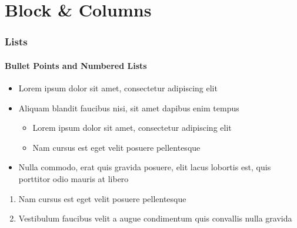 \documentclass[
	10pt, %
]{beamer}
\begin{document}
\begin{frame}
\begin{columns}[t]
\begin{column}{0.5\textwidth}
\begin{center}
\end{center}
		\end{column}
	\end{columns}
\end{frame}


\section{Block \& Columns}
\begin{frame}
	\frametitle{Lists}
	\framesubtitle{Bullet Points and Numbered Lists} %

	\begin{itemize}
		\item Lorem ipsum dolor sit amet, consectetur adipiscing elit
		\item Aliquam blandit faucibus nisi, sit amet dapibus enim tempus
		\begin{itemize}
			\item Lorem ipsum dolor sit amet, consectetur adipiscing elit
			\item Nam cursus est eget velit posuere pellentesque
		\end{itemize}
		\item Nulla commodo, erat quis gravida posuere, elit lacus lobortis est, quis porttitor odio mauris at libero
	\end{itemize}

	\bigskip %

	\begin{enumerate}
		\item Nam cursus est eget velit posuere pellentesque
		\item Vestibulum faucibus velit a augue condimentum quis convallis nulla gravida
	\end{enumerate}
\end{frame}
\end{document}

